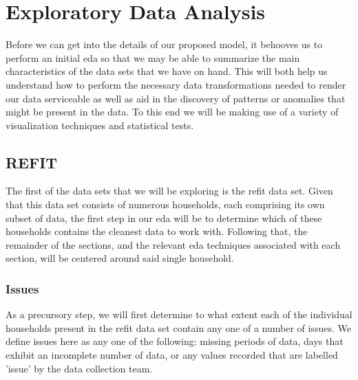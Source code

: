 \chapter{Exploratory Data Analysis}
\label{ch:Exploratory-Data-Analysis}
Before we can get into the details of our proposed model, it behooves us to perform an initial \gls{eda} so that we may be able to summarize the main characteristics of the data sets that we have on hand. This will both help us understand how to perform the necessary data transformations needed to render our data serviceable as well as aid in the discovery of patterns or anomalies that might be present in the data. To this end we will be making use of a variety of visualization techniques and statistical tests.

\section{REFIT}
\label{sec:Exploratory-Data-Analysis:REFIT}
The first of the data sets that we will be exploring is the \gls{refit} data set. Given that this data set consists of numerous households, each comprising its own subset of data, the first step in our \gls{eda} will be to determine which of these households contains the cleanest data to work with. Following that, the remainder of the sections, and the relevant \gls{eda} techniques associated with each section, will be centered around said single household.

\subsection{Issues}
\label{subsec:Exploratory-Data-Analysis:REFIT:Issues}
As a precursory step, we will first determine to what extent each of the individual households present in the \gls{refit} data set contain any one of a number of issues. We define issues here as any one of the following: missing periods of data, days that exhibit an incomplete number of data, or any values recorded that are labelled 'issue' by the data collection team.


